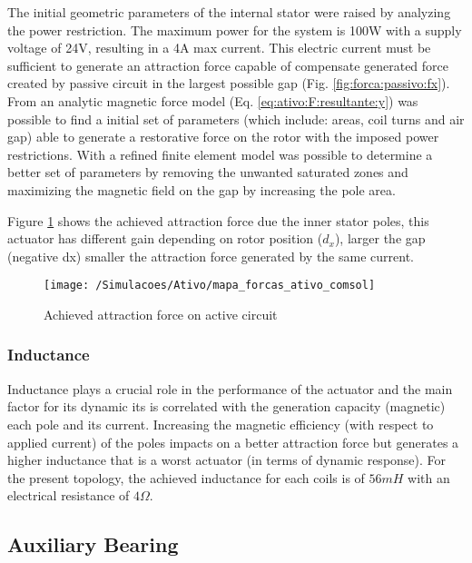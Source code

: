 \documentclass[10pt,fleqn,a4paper,twoside]{article}
\begin{document}
	The initial geometric parameters of the internal stator were raised by analyzing the power restriction. The maximum power for the system is 100W with a  supply voltage of 24V, resulting in a 4A max current. This electric current must be sufficient to generate an attraction force capable
	of compensate generated force created by passive circuit  in the largest  possible gap (Fig. \ref{fig:forca:passivo:fx}). From an analytic magnetic force model (Eq. \eqref{eq:ativo:F:resultante:y}) was possible to find a initial set of parameters (which include: areas, coil turns and air gap) able to generate a restorative force on the rotor with the imposed power restrictions. With a refined finite element model was possible to determine a better set of parameters by removing the unwanted saturated zones and maximizing the magnetic field on the gap by increasing the pole area. 
	
	Figure \ref{fig:forca:ativo} shows the achieved attraction force due the inner stator poles, this actuator has different gain depending on rotor position ($d_x$), larger the gap (negative dx) smaller the attraction force generated by the same current.
	
		
	\begin{figure}[ht]
	\centering
	\texttt{[image: /Simulacoes/Ativo/mapa\_forcas\_ativo\_comsol]}
	\caption{Achieved attraction force on active circuit}
	\label{fig:forca:ativo}
	\end{figure}		
	
	
	
	\subsubsection{Inductance} \label{subsec:at:indutancia}
	
	Inductance plays a crucial role in the performance of the actuator and the main factor for its dynamic its is correlated with the generation capacity (magnetic) each pole and its current. Increasing the magnetic efficiency (with respect to applied current) of the poles impacts on a better attraction force but generates a higher inductance that is a worst actuator (in terms of dynamic response). For the present topology, the achieved inductance for each coils is of $56 mH$ with an electrical resistance of $4 \Omega$. 
	
	
	\subsection{Auxiliary Bearing}
	
\end{document}

